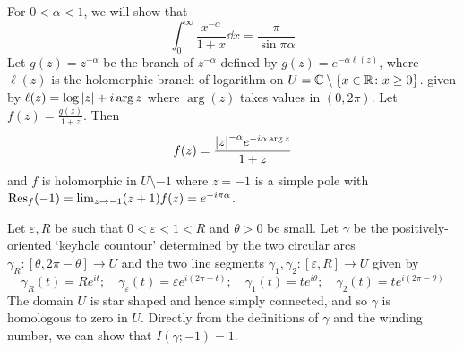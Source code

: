 \begin{example}
	For \( 0 < \alpha < 1 \), we will show that
	\[
		\int_0^\infty \frac{x^{-\alpha}}{1+x} \dd{x} = \frac{\pi}{\sin \pi \alpha}
	\]
	Let \( g(z) = z^{-\alpha} \) be the branch of \( z^{-\alpha} \) defined by \( g(z) = e^{-\alpha \ell(z)} \), where \( \ell(z) \) is the holomorphic branch of logarithm on \( U = \mathbb C \setminus \qty{x \in \mathbb R \colon x \geq 0} \).
	given by \( \ell(z) = \log \abs{z} + i \arg z \) where \( \arg(z) \) takes values in \( (0,2\pi) \).
	Let \( f(z) = \frac{g(z)}{1+z} \).
	Then
	\[
		f(z) = \frac{\abs{z}^{-\alpha} e^{-i\alpha \arg z}}{1+z}
	\]
	and \( f \) is holomorphic in \( U \setminus \qty{-1} \) where \( z = -1 \) is a simple pole with \( \Res_f(-1) = \lim_{z \to -1}(z+1)f(z) = e^{-i\pi \alpha} \).

	Let \( \varepsilon, R \) be such that \( 0 < \varepsilon < 1 < R \) and \( \theta > 0 \) be small.
	Let \( \gamma \) be the positively-oriented `keyhole countour' determined by the two circular arcs \( \gamma_R \colon [\theta,2\pi-\theta] \to U \) and the two line segments \( \gamma_1, \gamma_2 \colon [\varepsilon, R] \to U \) given by
	\[
		\gamma_R(t) = Re^{it};\quad \gamma_\varepsilon(t) = \varepsilon e^{i(2\pi - t)};\quad \gamma_1(t) = te^{i\theta};\quad \gamma_2(t) = te^{i(2\pi - \theta)}
	\]
	The domain \( U \) is star shaped and hence simply connected, and so \( \gamma \) is homologous to zero in \( U \).
	Directly from the definitions of \( \gamma \) and the winding number, we can show that \( I(\gamma; -1) = 1 \).


\end{example}
